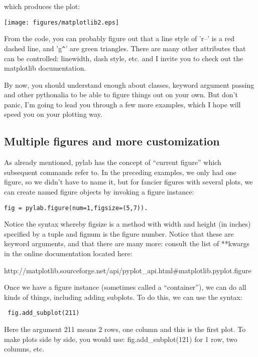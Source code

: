 {\noindent which produces the plot: 

\texttt{[image: figures/matplotlib2.eps]}

\noindent   From the code, you can probably figure out that a line style of 'r--' is a red dashed line,  and 'g\verb|^|'  are green triangles.  
There are many other attributes that can be controlled: linewidth, dash style, etc. and I invite you to check out the {\color{blue}matplotlib} documentation.

\noindent By now, you should understand enough about classes, keyword argument passing and other pythonalia to be able to figure things out on your own.   But don't panic, I'm going to lead you through a few more examples, which I hope will speed you on your plotting way.  



\subsection{Multiple figures and more customization}
As already mentioned,  {\color{blue}pylab} has the concept of ``current figure'' which subsequent commands refer to.   In the preceding examples, we only had one figure, so we didn't have to name it, but for fancier figures with several plots, we 
can create  named figure objects by invoking a {\color{blue}figure} instance: 
 
 {\color{blue}\begin{verbatim}
fig = pylab.figure(num=1,figsize=(5,7)). 
\end{verbatim}}

\noindent  Notice the syntax whereby {\color{blue} figsize}  is a method with  width and height (in inches) specified by a tuple and {\color{blue}fignum}  is the figure number.    Notice that these are keyword arguments, and that there are many more:  consult the list of  **kwargs in the online documentation  located here:

 http://matplotlib.sourceforge.net/api/pyplot\_api.html\#matplotlib.pyplot.figure 

Once we have a figure instance (sometimes called a ``container''), we can do all kinds of things, including adding subplots.  To do this, we can use the syntax:

{\color{blue}\begin{verbatim}
 fig.add_subplot(211) 
 \end{verbatim}}
 \noindent Here the 
argument  211 means 2 rows, one column and this is the first plot.  To make plots side by side, you would use: {\color{blue} fig.add\_subplot(121) } for  1 row, two columns, etc.  

}
